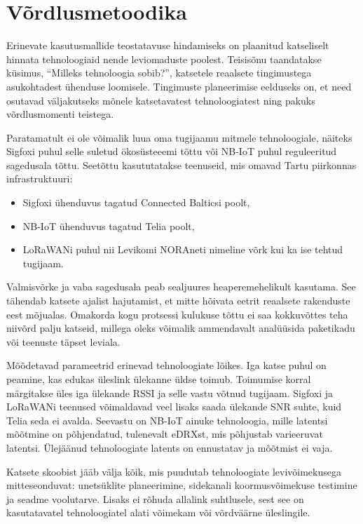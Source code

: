 \documentclass[12pt]{article}
\begin{document}
    \newpage
    \section{Võrdlusmetoodika}

    Erinevate kasutusmallide teostatavuse hindamiseks on plaanitud katseliselt hinnata tehnoloogiaid nende leviomaduste poolest.
    Teisisõnu taandatakse küsimus, "`Milleks tehnoloogia sobib?"', katsetele reaalsete tingimustega asukohtadest ühenduse loomisele.
    Tingimuste planeerimise eelduseks on, et need osutavad väljakutseks mõnele katsetavatest tehnoloogiatest ning pakuks võrdlusmomenti teistega.

    Paratamatult ei ole võimalik luua oma tugijaamu mitmele tehnoloogiale, näiteks Sigfoxi puhul selle suletud ökosüsteeemi tõttu või NB-IoT puhul reguleeritud sagedusala tõttu.
    Seetõttu kasututatakse teenuseid, mis omavad Tartu piirkonnas infrastruktuuri:
    \begin{itemize}
        \item Sigfoxi ühenduvus tagatud Connected Balticsi poolt,
        \item NB-IoT ühenduvus tagatud Telia poolt,
        \item LoRaWANi puhul nii Levikomi NORAneti nimeline võrk kui ka ise tehtud tugijaam.
    \end{itemize}
    Valmisvõrke ja vaba sagedusala peab sealjuures heaperemehelikult kasutama.
    See tähendab katsete ajalist hajutamist, et mitte hõivata eetrit reaalsete rakenduste eest mõjualas.
    Omakorda kogu protsessi kulukuse tõttu ei saa kokkuvõttes teha niivõrd palju katseid, millega oleks võimalik ammendavalt analüüsida paketikadu või teenuste täpset leviala.

    Mõõdetavad parameetrid erinevad tehnoloogiate lõikes.
    Iga katse puhul on peamine, kas edukas üleslink ülekanne üldse toimub.
    Toimumise korral märgitakse üles iga ülekande RSSI ja selle vastu võtnud tugijaam.
    Sigfoxi ja LoRaWANi teenused võimaldavad veel lisaks saada ülekande SNR suhte, kuid Telia seda ei avalda.
    Seevastu on NB-IoT ainuke tehnoloogia, mille latentsi mõõtmine on põhjendatud, tulenevalt eDRXst, mis põhjustab varieeruvat latentsi.
    Ülejäänud tehnoloogiate latents on ennustatav ja mõõtmist ei vaja.

    Katsete skoobist jääb välja kõik, mis puudutab tehnoloogiate levivõimekusega mitteseonduvat: unetsüklite planeerimine, sidekanali koormusvõimekuse testimine ja seadme voolutarve.
    Lisaks ei rõhuda allalink suhtlusele, sest see on kasutatavatel tehnoloogiatel alati võimekam või võrdväärne üleslingile.
\end{document}
